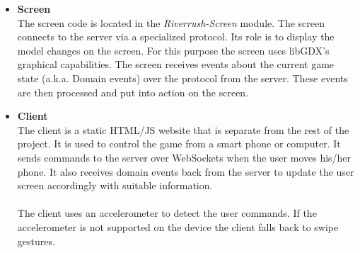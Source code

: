 \documentclass[11pt,a4paper]{article}
\begin{document}
\begin{itemize}
\item \textbf{Screen} \\
The screen code is located in the \emph{Riverrush-Screen} module. The screen connects to the server via a specialized protocol. Its role is to display the model changes on the screen. For this purpose the screen uses libGDX's graphical capabilities. The screen receives events about the current game state (a.k.a. Domain events) over the protocol from the server. These events are then processed and put into action on the screen.\\

\item \textbf{Client} \\
The client is a static HTML/JS website that is separate from the rest of the project. It is used to control the game from a smart phone or computer. It sends commands to the server over WebSockets when the user moves his/her phone. It also receives domain events back from the server to update the user screen accordingly with suitable information.\\
\\
The client uses an accelerometer to detect the user commands. If the accelerometer is not supported on the device the client falls back to swipe gestures.


\end{itemize}
\end{document}
